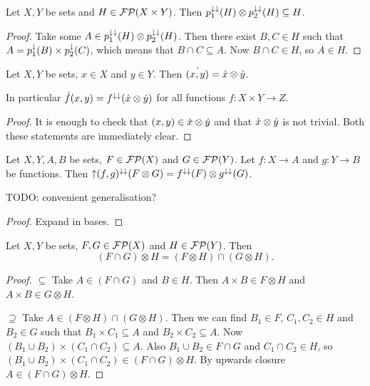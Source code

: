 \begin{lemma} \label{filterFactorisationInequality}
Let $X,Y$ be sets and $H \in \operatorname{\mathcal{FP}}(X\times Y)$. Then $p_1^{\downarrow\downarrow}(H)\otimes p_2^{\downarrow\downarrow}(H) \subseteq H$.
\end{lemma}
\begin{proof}
Take some $A\in p_1^{\downarrow\downarrow}(H)\otimes p_2^{\downarrow\downarrow}(H)$. Then there exist $B,C\in H$ such that $A = p_1^\downarrow(B)\times p_2^\downarrow(C)$, which means that $B\cap C\subseteq A$. Now $B\cap C \in H$, so $A\in H$.
\end{proof}

\begin{lemma} \label{productPrincipalUltrafilter}
Let $X,Y$ be sets, $x\in X$ and $y\in Y$. Then $\dot{(x,y)} = \dot{x} \otimes \dot{y}$.
\end{lemma}
In particular $\dot{f}(x,y) = f^{\downarrow\downarrow}(\dot{x}\otimes\dot{y})$ for all functions $f: X\times Y \to Z$.
\begin{proof}
It is enough to check that $(x,y)\in\dot{x}\otimes\dot{y}$ and that $\dot{x}\otimes\dot{y}$ is not trivial. Both these statements are immediately clear.
\end{proof}

\begin{lemma} \label{functionsOfProductFilters}
Let $X,Y, A,B$ be sets, $F\in \operatorname{\mathcal{FP}}(X)$ and $G\in \operatorname{\mathcal{FP}}(Y)$. Let $f: X\to A$ and $g: Y\to B$ be functions. Then $\operatorname{\uparrow} (f,g)^{\downarrow\downarrow}(F\otimes G) = f^{\downarrow\downarrow}(F)\otimes g^{\downarrow\downarrow}(G)$.
\end{lemma}
TODO: convenient generalisation?
\begin{proof}
Expand in bases.
\end{proof}

\begin{lemma} \label{intersectionProductFilters}
Let $X,Y$ be sets, $F,G\in \operatorname{\mathcal{FP}}(X)$ and $H\in\operatorname{\mathcal{FP}}(Y)$. Then
\[ (F\cap G)\otimes H = (F\otimes H)\cap (G\otimes H). \]
\end{lemma}
\begin{proof}
$\boxed{\subseteq}$ Take $A\in (F\cap G)$ and $B\in H$. Then $A\times B\in F\otimes H$ and $A\times B\in G\otimes H$.

$\boxed{\supseteq}$ Take $A \in (F\otimes H)\cap (G\otimes H)$. Then we can find $B_1\in F$, $C_1,C_2\in H$ and $B_2\in G$ such that $B_1\times C_1 \subseteq A$ and $B_2\times C_2 \subseteq A$. Now $(B_1\cup B_2)\times (C_1\cap C_2) \subseteq A$. Also $B_1\cup B_2 \in F\cap G$ and $C_1\cap C_2 \in H$, so $(B_1\cup B_2)\times (C_1\cap C_2) \in (F\cap G)\otimes H$. By upwards closure $A\in (F\cap G)\otimes H$.
\end{proof}

